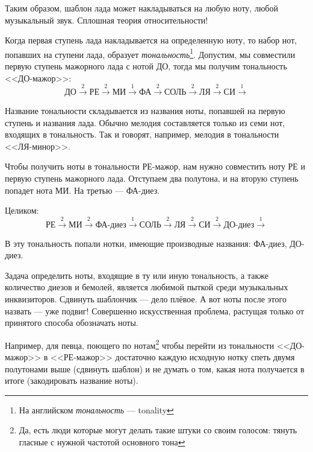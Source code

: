 Таким образом, шаблон лада может накладываться на любую ноту, любой музыкальный звук. Сплошная теория относительности!

Когда первая ступень лада накладывается на определенную ноту, то набор нот, попавших на ступени лада, образует \emph{тональность}\footnote{На английском \emph{тональность} --- tonality}. Допустим, мы совместили первую ступень мажорного лада с нотой ДО, тогда мы получим тональность <<ДО-мажор>>: 
\[
    \text{ДО}\xrightarrow{2}
    \text{РЕ}\xrightarrow{2}
    \text{МИ}\xrightarrow{1}
    \text{ФА}\xrightarrow{2}
    \text{СОЛЬ}\xrightarrow{2}
    \text{ЛЯ}\xrightarrow{2}
    \text{СИ}\xrightarrow{1}
\]

Название тональности складывается из названия ноты, попавшей на первую ступень и названия лада. Обычно мелодия составляется только из семи нот, входящих в тональность. Так и говорят, например, мелодия в тональности <<ЛЯ-минор>>.

\begin{Example}
    \label{ex:harmony:lad:d:maj}
    
    Чтобы получить ноты в тональности РЕ-мажор, нам нужно совместить ноту РЕ и первую ступень мажорного лада. Отступаем два полутона, и на вторую ступень попадет нота МИ. На третью --- ФА-диез.
    
    Целиком:
    \[
        \text{РЕ}\xrightarrow{2} 
        \text{МИ}\xrightarrow{2} 
        \text{ФА-диез}\xrightarrow{1} 
        \text{СОЛЬ}\xrightarrow{2} 
        \text{ЛЯ}\xrightarrow{2} 
        \text{СИ}\xrightarrow{2} 
        \text{ДО-диез}\xrightarrow{1}
    \]
    
    В эту тональность попали нотки, имеющие производные названия: ФА-диез, ДО-диез.
\end{Example}

Задача определить ноты, входящие в ту или иную тональность, а также количество диезов и бемолей, является любимой пыткой среди музыкальных инквизиторов. Сдвинуть шаблончик --- дело плёвое. А вот ноты после этого назвать --- уже подвиг! Совершенно искусственная проблема, растущая только от принятого способа обозначать ноты.

Например, для певца, поющего по нотам\footnote{Да, есть люди которые могут делать такие штуки со своим голосом: тянуть гласные с нужной частотой основного тона} чтобы перейти из тональности <<ДО-мажор>> в <<РЕ-мажор>> достаточно каждую исходную нотку спеть двумя полутонами выше (сдвинуть шаблон) и не думать о том, какая нота получается в итоге (закодировать название ноты).

